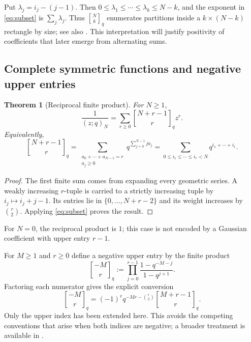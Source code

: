 \documentclass[11pt,a4paper]{article}
\numberwithin{equation}{section}
\newtheorem{theorem}{Theorem}[section]
\theoremstyle{definition}
\theoremstyle{remark}
\newcommand{\qb}[2]{\genfrac{[}{]}{0pt}{}{#1}{#2}_{q}}
\newcommand{\poch}[3]{(#1;#2)_{#3}}
\begin{document}
Put $\lambda_j=i_j-(j-1)$. Then
$0\le\lambda_1\le\cdots\le\lambda_k\le N-k$, and the exponent in
\eqref{eq:subset} is $\sum_j\lambda_j$. Thus $\qb Nk$ enumerates partitions
inside a $k\times(N-k)$ rectangle by size; see also \cite{DLMF26}. This interpretation
will justify positivity of coefficients that later emerge from alternating sums.

\subsection{Complete symmetric functions and negative upper entries}
\begin{theorem}[Reciprocal finite product]\label{thm:reciprocal}
For $N\ge1$,
\begin{equation}\label{eq:reciprocal-product}
 \frac1{\poch z q N}=\sum_{r\ge0}\qb{N+r-1}r z^r.
\end{equation}
Equivalently,
\begin{equation}\label{eq:complete-symmetric}
 \qb{N+r-1}r
 =\sum_{\substack{a_0+\cdots+a_{N-1}=r\\a_j\ge0}}
       q^{\sum_{j=0}^{N-1}j a_j}
 =\sum_{0\le i_1\le\cdots\le i_r<N}q^{i_1+\cdots+i_r}.
\end{equation}
\end{theorem}
\begin{proof}
The first finite sum comes from expanding every geometric series. A weakly
increasing $r$-tuple is carried to a strictly increasing tuple by
$i_j\mapsto i_j+j-1$. Its entries lie in $\{0,\ldots,N+r-2\}$ and its weight
increases by $\binom r2$. Applying \eqref{eq:subset} proves the result.
\end{proof}
For $N=0$, the reciprocal product is $1$; this case is not encoded by a Gaussian
coefficient with upper entry $r-1$.

For $M\ge1$ and $r\ge0$ define a negative upper entry by the finite product
\[
 \qb{-M}r:=\prod_{j=0}^{r-1}\frac{1-q^{-M-j}}{1-q^{j+1}}.
\]
Factoring each numerator gives the explicit conversion
\begin{equation}\label{eq:negative-upper}
 \qb{-M}r=(-1)^r q^{-Mr-\binom r2}\qb{M+r-1}r.
\end{equation}
Only the upper index has been extended here. This avoids the competing
conventions that arise when both indices are negative; a broader treatment is
available in \cite{FormichellaStraub}.
\end{document}
